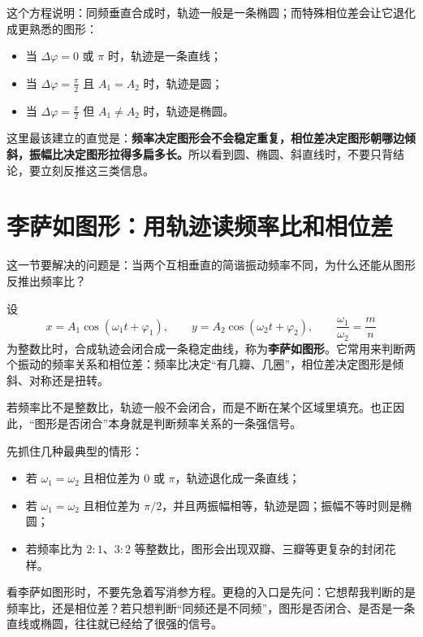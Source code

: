 \documentclass[lang=cn,11pt]{elegantbook}
\begin{document}
这个方程说明：同频垂直合成时，轨迹一般是一条椭圆；而特殊相位差会让它退化成更熟悉的图形：
\begin{itemize}
  \item 当 \(\Delta\varphi=0\) 或 \(\pi\) 时，轨迹是一条直线；
  \item 当 \(\Delta\varphi=\frac{\pi}{2}\) 且 \(A_1=A_2\) 时，轨迹是圆；
  \item 当 \(\Delta\varphi=\frac{\pi}{2}\) 但 \(A_1\neq A_2\) 时，轨迹是椭圆。
\end{itemize}

\begin{note}
这里最该建立的直觉是：\textbf{频率决定图形会不会稳定重复，相位差决定图形朝哪边倾斜，振幅比决定图形拉得多扁多长。}所以看到圆、椭圆、斜直线时，不要只背结论，要立刻反推这三类信息。
\end{note}

\section{李萨如图形：用轨迹读频率比和相位差}

这一节要解决的问题是：当两个互相垂直的简谐振动频率不同，为什么还能从图形反推出频率比？

设
\[
x=A_1\cos(\omega_1 t+\varphi_1),\qquad
y=A_2\cos(\omega_2 t+\varphi_2),\qquad
\frac{\omega_1}{\omega_2}=\frac{m}{n}
\]
为整数比时，合成轨迹会闭合成一条稳定曲线，称为\textbf{李萨如图形}。它常用来判断两个振动的频率关系和相位差：频率比决定“有几瓣、几圈”，相位差决定图形是倾斜、对称还是扭转。

\begin{note}
若频率比不是整数比，轨迹一般不会闭合，而是不断在某个区域里填充。也正因此，“图形是否闭合”本身就是判断频率关系的一条强信号。
\end{note}

先抓住几种最典型的情形：
\begin{itemize}
  \item 若 \(\omega_1=\omega_2\) 且相位差为 \(0\) 或 \(\pi\)，轨迹退化成一条直线；
  \item 若 \(\omega_1=\omega_2\) 且相位差为 \(\pi/2\)，并且两振幅相等，轨迹是圆；振幅不等时则是椭圆；
  \item 若频率比为 \(2:1\)、\(3:2\) 等整数比，图形会出现双瓣、三瓣等更复杂的封闭花样。
\end{itemize}

\begin{remark}
看李萨如图形时，不要先急着写消参方程。更稳的入口是先问：它想帮我判断的是频率比，还是相位差？若只想判断“同频还是不同频”，图形是否闭合、是否是一条直线或椭圆，往往就已经给了很强的信号。
\end{remark}
\end{document}
